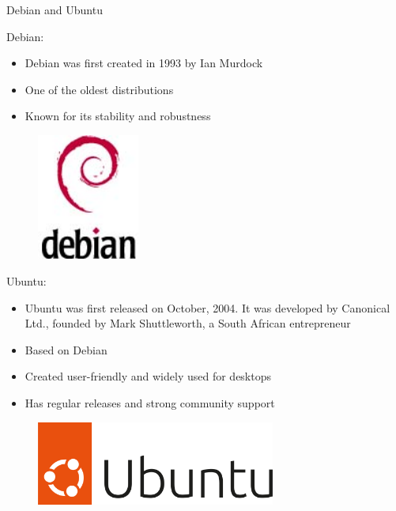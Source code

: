 \documentclass{beamer}
\begin{document}
\begin{frame}{Debian and Ubuntu}
  \begin{minipage}[t]{0.65\textwidth}
    Debian:
    \begin{itemize}
      \item Debian was first created in 1993 by Ian Murdock
      \item One of the oldest distributions
      \item Known for its stability and robustness
    \end{itemize}
  \end{minipage}
  \hfill
  \begin{minipage}[t]{0.3\textwidth}
    \begin{figure}[h]
      \includegraphics[width=0.3\textwidth]{images/debian.jpg}
    \end{figure}
  \end{minipage}

  \begin{minipage}[t]{0.65\textwidth}
    Ubuntu:
    \begin{itemize}
      \item Ubuntu was first released on October, 2004. It was developed by Canonical Ltd., founded by Mark Shuttleworth, a South African entrepreneur
      \item Based on Debian
      \item Created user-friendly and widely used for desktops
      \item Has regular releases and strong community support
    \end{itemize}
  \end{minipage}
  \hfill
  \begin{minipage}[t]{0.3\textwidth}
    \begin{figure}[h]
      \includegraphics[width=0.7\textwidth]{images/ubuntu.png}
    \end{figure}
  \end{minipage}
\end{frame}
\end{document}
